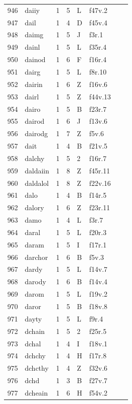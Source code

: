 \documentclass[11pt,a4paper]{article}
\begin{document}
\begin{landscape}
\begin{longtable}{@{}r>{\ttfamily}lrrl>{\ttfamily}l>{\raggedright\arraybackslash}p{80mm}>{\raggedright\arraybackslash}p{36mm}@{}}
946 & daiiy & 1 & 5 & L & f47v.2 &  & \\
947 & dail & 1 & 4 & D & f45v.4 &  & \\
948 & daimg & 1 & 5 & J & f3r.1 &  & \\
949 & dainl & 1 & 5 & L & f35r.4 &  & \\
950 & dainod & 1 & 6 & F & f16r.4 &  & \\
951 & dairg & 1 & 5 & L & f8r.10 &  & \\
952 & dairin & 1 & 6 & Z & f16v.6 &  & \\
953 & dairl & 1 & 5 & Z & f44v.13 &  & \\
954 & dairo & 1 & 5 & B & f23r.7 &  & \\
955 & dairod & 1 & 6 & J & f13v.6 &  & \\
956 & dairodg & 1 & 7 & Z & f5v.6 &  & \\
957 & dait & 1 & 4 & B & f21v.5 &  & \\
958 & dalchy & 1 & 5 & 2 & f16r.7 &  & \\
959 & daldaiin & 1 & 8 & Z & f45r.11 &  & \\
960 & daldalol & 1 & 8 & Z & f22v.16 &  & \\
961 & dalo & 1 & 4 & B & f14r.5 &  & \\
962 & dalory & 1 & 6 & Z & f23r.11 &  & \\
963 & damo & 1 & 4 & L & f3r.7 &  & \\
964 & daral & 1 & 5 & L & f20r.3 &  & \\
965 & daram & 1 & 5 & I & f17r.1 &  & \\
966 & darchor & 1 & 6 & B & f5v.3 &  & \\
967 & dardy & 1 & 5 & L & f14v.7 &  & \\
968 & darody & 1 & 6 & B & f14v.4 &  & \\
969 & darom & 1 & 5 & L & f19v.2 &  & \\
970 & daror & 1 & 5 & B & f18v.8 &  & \\
971 & dayty & 1 & 5 & L & f9r.4 &  & \\
972 & dchain & 1 & 5 & 2 & f25r.5 &  & \\
973 & dchal & 1 & 4 & I & f18v.1 &  & \\
974 & dchchy & 1 & 4 & H & f17r.8 &  & \\
975 & dchcthy & 1 & 4 & Z & f32v.6 &  & \\
976 & dchd & 1 & 3 & B & f27v.7 &  & \\
977 & dcheain & 1 & 6 & H & f54v.2 &  & \\

\end{longtable}
\end{landscape}
\end{document}
